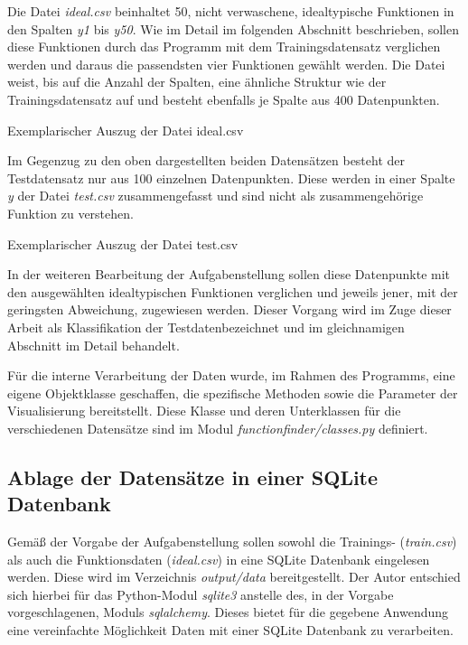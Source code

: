 Die Datei \emph{ideal.csv} beinhaltet 50, nicht \glqq verwaschene\grqq , idealtypische Funktionen in den Spalten \emph{y1} bis \emph{y50}. Wie im Detail im folgenden Abschnitt beschrieben, sollen diese Funktionen durch das Programm mit dem Trainingsdatensatz verglichen werden und daraus die passendsten vier Funktionen gewählt werden. Die Datei weist, bis auf die Anzahl der Spalten, eine ähnliche Struktur wie der Trainingsdatensatz auf und besteht ebenfalls je Spalte aus 400 Datenpunkten. 

\begin{table}[H]
\small
\centering
{}
\caption{Exemplarischer Auszug der Datei ideal.csv}
\label{tab:ideal.csv}
\end{table} 

Im Gegenzug zu den oben dargestellten beiden Datensätzen besteht der Testdatensatz nur aus 100 einzelnen Datenpunkten. Diese werden in einer Spalte \emph{y} der Datei \emph{test.csv} zusammengefasst und sind nicht als zusammengehörige Funktion zu verstehen. 

\begin{table}[H]
\small
\centering
{}
\caption{Exemplarischer Auszug der Datei test.csv}
\label{tab:test.csv}
\end{table} 

In der weiteren Bearbeitung der Aufgabenstellung sollen diese Datenpunkte mit den ausgewählten idealtypischen Funktionen verglichen und jeweils jener, mit der geringsten Abweichung, zugewiesen werden. Dieser Vorgang wird im Zuge dieser Arbeit als \glqq Klassifikation der Testdaten\grqq bezeichnet und im gleichnamigen Abschnitt im Detail behandelt.

Für die interne Verarbeitung der Daten wurde, im Rahmen des Programms, eine eigene Objektklasse geschaffen, die spezifische Methoden sowie die Parameter der Visualisierung bereitstellt. Diese Klasse und deren Unterklassen für die verschiedenen Datensätze sind im Modul \emph{functionfinder/classes.py} definiert.

\subsection{Ablage der Datensätze in einer SQLite Datenbank}

Gemäß der Vorgabe der Aufgabenstellung sollen sowohl die Trainings- (\emph{train.csv}) als auch die Funktionsdaten (\emph{ideal.csv}) in eine SQLite Datenbank eingelesen werden. Diese wird im Verzeichnis \emph{output/data} bereitgestellt. Der Autor entschied sich hierbei für das Python-Modul \emph{sqlite3} anstelle des, in der Vorgabe vorgeschlagenen, Moduls \emph{sqlalchemy}. Dieses bietet für die gegebene Anwendung eine vereinfachte Möglichkeit Daten mit einer SQLite Datenbank zu verarbeiten.

